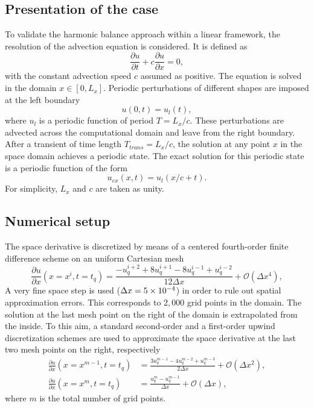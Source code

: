 
\subsection{Presentation of the case}
\label{sec:presentation_advection}

To validate the harmonic balance approach within a 
linear framework, the resolution of the
advection equation is considered. It is defined as
\begin{equation}
  \label{eq:convection}
  \frac{\partial u}{\partial t} + c \frac{\partial u}{\partial x} = 0,
\end{equation}
with the constant advection speed $c$ assumed as positive. 
The equation is solved in the domain $x \in [0, L_x]$. 
Periodic perturbations of different shapes are imposed at the left boundary
\begin{equation}
   u(0, t) = u_l (t),
\end{equation}
where $u_l$ is a periodic function of period $T=L_x/c$.
These perturbations are advected across the computational 
domain and leave from the right boundary. After a transient of time length $T_{trans}=L_x/c$, 
the solution at any point $x$ in the space domain achieves a periodic state. 
The exact solution for this periodic state is a periodic function of the form
\begin{equation}
    u_{ex}(x,t)=u_l(x/c+t).
\end{equation}
For simplicity, $L_x$ and $c$ are taken as unity.

\subsection{Numerical setup}

The space derivative is discretized by means of a centered 
fourth-order finite difference scheme on an uniform Cartesian mesh
\begin{equation}
    \frac{\partial u}{\partial x} (x = x^i, t=t_q) =
    \frac{-u^{i+2}_{q} + 8 u^{i+1}_{q} - 8 u^{i-1}_{q} + u^{i-2}_{q}}{12\Delta x}
    + \mathcal{O} (\Delta x^4),
    \label{eq:convection_center4}
\end{equation}
A very fine space step is used ($\Delta x=5\times 10^{-4}$) in order to rule 
out spatial approximation errors. This corresponds to $2,000$ grid points
in the domain. 
The solution at the last mesh 
point on the right of the domain is extrapolated 
from the inside. To this aim, a standard second-order 
and a first-order upwind discretization schemes
are used to approximate the space derivative at 
the last two mesh points on the right, respectively
\begin{align}
    \frac{\partial u}{\partial x} (x = x^{m-1}, t=t_q) &=
    \frac{3 u^{m-1}_{q} - 4 u^{m-2}_{q} + u^{m-3}_{q}}{2\Delta x} + \mathcal{O} (\Delta x^2), \\
    \frac{\partial u}{\partial x} (x = x^m, t=t_q) &= 
    \frac{u^{m}_{q} - u^{m-1}_{q}}{\Delta x} + \mathcal{O} (\Delta x),
\label{eq:upwind_scheme}
\end{align}
where $m$ is the total number of grid points.

